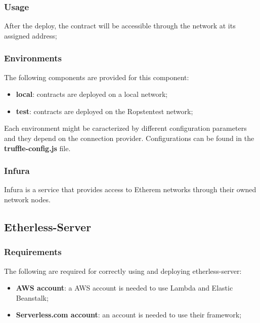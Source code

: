 \subsubsection{Usage}
After the deploy, the contract will be accessible through the network at its assigned address;
\subsubsection{Environments}
The following components are provided for this component:
\begin{itemize}
	\item \textbf{local}: contracts are deployed on a local network;
	\item \textbf{test}: contracts are deployed on the Ropsten\glo test network;
\end{itemize}
Each environment might be caracterized by different configuration parameters and they depend on the connection provider. Configurations can be found in the \textbf{truffle-config.js} file.
\subsubsection{Infura}
Infura is a service that provides access to Etherem networks through their owned network nodes.
\subsection{Etherless-Server}
\subsubsection{Requirements}
The following are required for correctly using and deploying etherless-server:
\begin{itemize}
	\item \textbf{AWS account}: a AWS account is needed to use Lambda and Elastic Beanstalk;
	\item \textbf{Serverless.com account}: an account is needed to use their framework;
\end{itemize}
